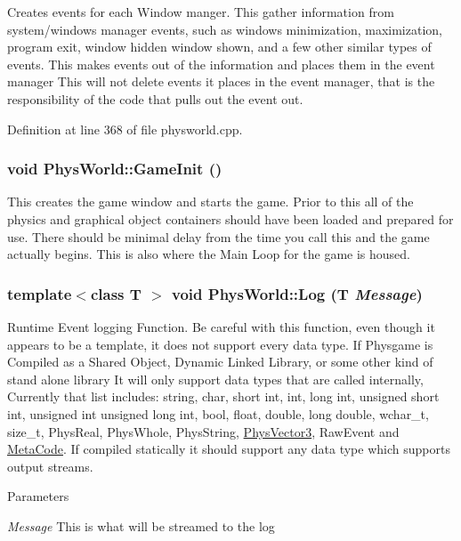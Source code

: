 Creates events for each Window manger. This gather information from system/windows manager events, such as windows minimization, maximization, program exit, window hidden window shown, and a few other similar types of events. This makes events out of the information and places them in the event manager This will not delete events it places in the event manager, that is the responsibility of the code that pulls out the event out. 

Definition at line 368 of file physworld.cpp.\hypertarget{classPhysWorld_a6d65a7412c1711497fbd1173f879243a}{
\subsubsection[{GameInit}]{\setlength{\rightskip}{0pt plus 5cm}void PhysWorld::GameInit ()}}
\label{db/df5/classPhysWorld_a6d65a7412c1711497fbd1173f879243a}


This creates the game window and starts the game. Prior to this all of the physics and graphical object containers should have been loaded and prepared for use. There should be minimal delay from the time you call this and the game actually begins. This is also where the Main Loop for the game is housed. \hypertarget{classPhysWorld_a5e9fead1c3100f5dbd5ca985b82b85ea}{
\subsubsection[{Log}]{\setlength{\rightskip}{0pt plus 5cm}template$<$class T $>$ void PhysWorld::Log (T {\em Message})}}
\label{db/df5/classPhysWorld_a5e9fead1c3100f5dbd5ca985b82b85ea}


Runtime Event logging Function. Be careful with this function, even though it appears to be a template, it does not support every data type. If Physgame is Compiled as a Shared Object, Dynamic Linked Library, or some other kind of stand alone library It will only support data types that are called internally, Currently that list includes: string, char, short int, int, long int, unsigned short int, unsigned int unsigned long int, bool, float, double, long double, wchar\_\-t, size\_\-t, PhysReal, PhysWhole, PhysString, \hyperlink{classPhysVector3}{PhysVector3}, RawEvent and \hyperlink{classMetaCode}{MetaCode}. If compiled statically it should support any data type which supports output streams. 
\begin{DoxyParams}{Parameters}
\item[{\em Message}]This is what will be streamed to the log \end{DoxyParams}


